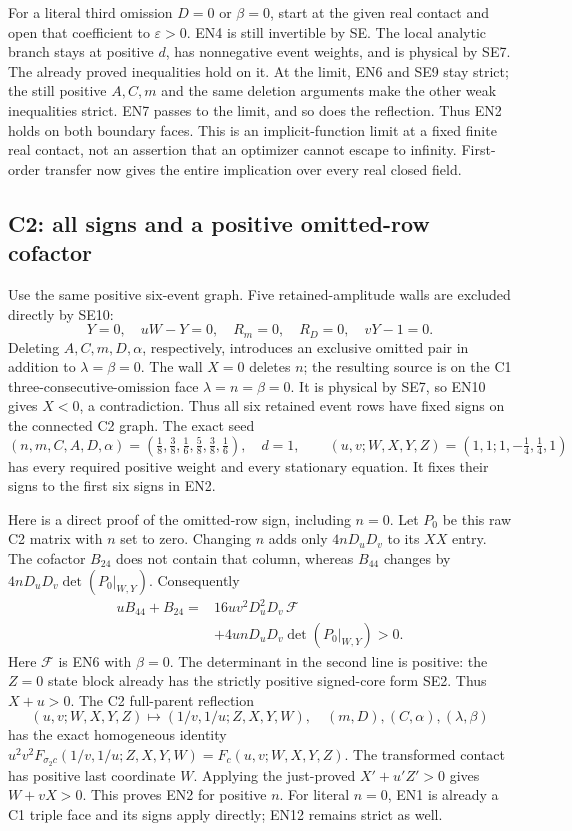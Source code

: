 For a literal third omission \(D=0\) or \(\beta=0\), start at the
given real contact and open that coefficient to \(\varepsilon>0\).
EN4 is still invertible by SE.  The local analytic branch stays at
positive \(d\), has nonnegative event weights, and is physical by SE7.
The already proved inequalities hold on it.  At the limit, EN6 and
SE9 stay strict; the still positive \(A,C,m\) and the same deletion
arguments make the other weak inequalities strict.  EN7 passes to
the limit, and so does the reflection.  Thus EN2 holds on both
boundary faces.  This is an implicit-function limit at a fixed
finite real contact, not an assertion that an optimizer cannot escape
to infinity.  First-order transfer now gives the entire implication
over every real closed field.

\subsection{C2: all signs and a positive omitted-row cofactor}

Use the same positive six-event graph.  Five retained-amplitude walls
are excluded directly by SE10:
\[
 Y=0,\quad uW-Y=0,\quad R_m=0,\quad R_D=0,\quad vY-1=0.
 \tag{EN11}
\]
Deleting \(A,C,m,D,\alpha\), respectively, introduces an exclusive
omitted pair in addition to \(\lambda=\beta=0\).
The wall \(X=0\) deletes \(n\); the resulting source is on the C1
three-consecutive-omission face \(\lambda=n=\beta=0\).
It is physical by SE7, so EN10 gives \(X<0\), a contradiction.
Thus all six retained event rows have fixed signs on the connected
C2 graph.  The exact seed
\[
 (n,m,C,A,D,\alpha)=(\tfrac18,\tfrac38,\tfrac16,
                              \tfrac58,\tfrac38,\tfrac16),\quad d=1,
 \qquad (u,v;W,X,Y,Z)=(1,1;1,-\tfrac14,\tfrac14,1)
\]
has every required positive weight and every stationary equation.
It fixes their signs to the first six signs in EN2.

Here is a direct proof of the omitted-row sign, including \(n=0\).
Let \(P_0\) be this raw C2 matrix with \(n\) set to zero.
Changing \(n\) adds only \(4nD_uD_v\) to its \(XX\) entry.
The cofactor \(B_{24}\) does not contain that column, whereas
\(B_{44}\) changes by \(4nD_uD_v\det(P_0|_{W,Y})\).
Consequently
\[
\begin{split}
 uB_{44}+B_{24}
  ={}&16uv^2D_u^2D_v\,\mathcal F\\
    &+4unD_uD_v\det(P_0|_{W,Y})>0 .
\end{split}\tag{EN12}
\]
Here \(\mathcal F\) is EN6 with \(\beta=0\).  The determinant in
the second line is positive: the \(Z=0\) state block already has
the strictly positive signed-core form SE2.  Thus \(X+u>0\).
The C2 full-parent reflection
\[
 (u,v;W,X,Y,Z)\mapsto(1/v,1/u;Z,X,Y,W),
 \quad (m,D),(C,\alpha),(\lambda,\beta)
\]
has the exact homogeneous identity
\(u^2v^2F_{\sigma_2c}(1/v,1/u;Z,X,Y,W)=F_c(u,v;W,X,Y,Z)\).
The transformed contact
has positive last coordinate \(W\).  Applying the just-proved
\(X'+u'Z'>0\) gives \(W+vX>0\).
This proves EN2 for positive \(n\).  For literal \(n=0\), EN1 is
already a C1 triple face and its signs apply directly; EN12 remains
strict as well.

